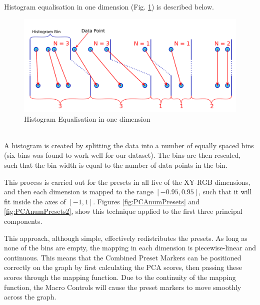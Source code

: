 \documentclass[11pt, oneside]{report}   	%
\begin{document}
Histogram equalisation in one dimension (Fig. \ref{fig:HistEq}) is described below.
\begin{figure}[h] 
	\vspace{-20pt}
	\centering
	\includegraphics[trim={0, 5pt, 0, 5pt}, clip, width = 6in]{HistogramEquilisation.png}
	\caption{Histogram Equalisation in one dimension}
	\label{fig:HistEq}
\end{figure}\\
A histogram is created by splitting the data into a number of equally spaced bins (six bins was found to work well for our dataset). The bins are then rescaled, such that the bin width is equal to the number of data points in the bin.

This process is carried out for the presets in all five of the XY-RGB dimensions, and then each dimension is mapped to the range $[-0.95, 0.95]$, such that it will fit inside the axes of $[-1, 1]$. Figures \ref{fig:PCAnumPresets} and \ref{fig:PCAnumPresets2}, show this technique applied to the first three principal components.

This approach, although simple, effectively redistributes the presets. As long as none of the bins are empty, the mapping in each dimension is piecewise-linear and continuous. This means that the Combined Preset Markers can be positioned correctly on the graph by first calculating the PCA scores, then passing these scores through the mapping function. Due to the continuity of the mapping function, the Macro Controls will cause the preset markers to move smoothly across the graph.
\end{document}
